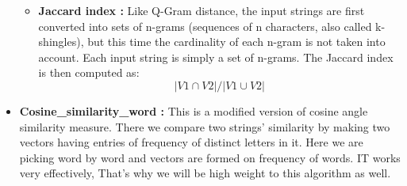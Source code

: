 \begin{itemize}
\begin{itemize}
        \item \textbf{Jaccard index : }Like Q-Gram distance, the input strings are first converted into sets of n-grams (sequences of n characters, also called k-shingles), but this time the cardinality of each n-gram is not taken into account. Each input string is simply a set of n-grams. The Jaccard index is then computed as: \\ 
        \begin{equation}
        |V1 \cap V2| / |V1 \cup V2|
        \end{equation}
    \end{itemize}
\item \textbf{Cosine\_similarity\_word : } This is a modified version of cosine angle similarity measure. There we compare two strings' similarity by making two vectors having entries of frequency of distinct letters in it. Here we are picking word by word and vectors are formed on frequency of words. IT works very effectively, That's why we will be high weight to this algorithm as well.
\end{itemize}
